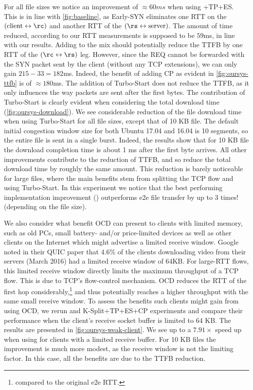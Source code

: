 For all file sizes we notice an improvement of $\approx60ms$ when using \oursys+TP+ES. This is in line with \autoref{fig:baseline}, as Early-SYN eliminates one RTT on the $(\mbox{client}\leftrightarrow\rc)$ and another RTT of the $(\rs\leftrightarrow\mbox{server})$. The amount of time reduced, according to our RTT measurements is supposed to be $59$ms, in line with our results. Adding \reconn to the mix should potentially reduce the TTFB by one RTT of the $(\rc\leftrightarrow\rs)$ leg. However, since the REQ cannot be forwarded with the SYN packet sent by the client (without any TCP extensions), we can only gain $215-33=182$ms. Indeed, the benefit of adding CP as evident in \autoref{fig:oursys-ttfb} is of $\approx 180$ms. The addition of Turbo-Start does not reduce the TTFB, as it only influences the way packets are sent after the first bytes. The contribution of Turbo-Start is clearly evident when considering the total download time (\autoref{fig:oursys-download}). We see considerable reduction of the file download time when using Turbo-Start for all file sizes, except that of 10 KB file. The default initial congestion window size for both Ubuntu 17.04 and 16.04 is 10 segments, so the entire file is sent in a single burst. Indeed, the results show that for 10 KB file the download completion time is about 1 ms after the first byte arrives. All other improvements contribute to the reduction of TTFB, and so reduce the total download time by roughly the same amount. This reduction is barely noticeable for large files, where the main benefits stem from splitting the TCP flow and using Turbo-Start.
In this experiment we notice that the best performing implementation improvement (\ie \oursys) outperforms e2e file transfer by up to 3 times! (depending on the file size).

We also consider what benefit OCD can present to clients with limited memory, such as old PCs, small battery- and/or price-limited devices as well as other clients on the Internet which might advertise a limited receive window. Google noted in their QUIC paper \cite{quic} that 4.6\% of the clients downloading video from their servers (March 2016) had a limited receive window of 64KB. For large-RTT flows, this limited receive window directly limits the maximum throughput of a TCP flow. This is due to TCP's flow-control mechanism. OCD reduces the RTT of the first hop considerably,\footnote{compared to the original e2e RTT.} and thus potentially reaches a higher throughput with the same small receive window.
To assess the benefits such clients might gain from using OCD, we rerun \oursys and K-Split+TP+ES+CP experiments and compare their performance when the client's receive socket buffer is limited to 64 KB. The results are presented in \autoref{fig:oursys-weak-client}. We see up to a $7.91\times$ speed up when using \oursys for clients with a limited receive buffer. For 10 KB files the improvement is much more modest, as the receive window is not the limiting factor. In this case, all the benefits are due to the TTFB reduction. 

